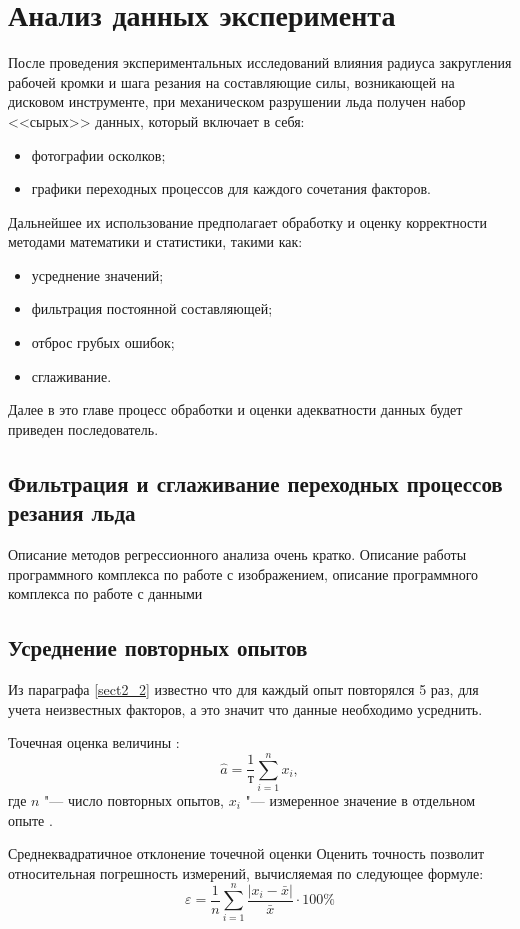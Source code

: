 \chapter{Анализ данных эксперимента}

После проведения экспериментальных исследований влияния радиуса закругления рабочей кромки и шага резания на составляющие силы, возникающей на дисковом инструменте, при механическом разрушении льда получен набор <<сырых>> данных, который включает в себя:
\begin{itemize}
	\item фотографии осколков;
	\item графики переходных процессов для каждого сочетания факторов.
\end{itemize}

Дальнейшее их использование предполагает обработку и оценку корректности методами математики и статистики, такими как:
\begin{itemize}
	\item усреднение значений;
	\item фильтрация постоянной составляющей;
	\item отброс грубых ошибок;
	\item сглаживание.
\end{itemize}

Далее в это главе процесс обработки и оценки адекватности данных будет приведен последователь.

\section{Фильтрация и сглаживание переходных процессов резания льда}
Описание методов регрессионного анализа очень кратко. Описание работы программного комплекса по работе с изображением, описание программного комплекса по работе с данными

\section{Усреднение повторных опытов}

Из параграфа \ref{sect2_2} известно что для каждый опыт повторялся 5 раз, для учета неизвестных факторов, а это значит что данные необходимо усреднить.

Точечная оценка величины :
\begin{equation}\label{eq:x_ocenka}
\hat{a}=\frac{1}{т}\sum_{i=1}^{n} x_i,
\end{equation}
где $ n $ "--- число повторных опытов, $ x_i $ "--- измеренное значение в отдельном опыте \cite{Zajigaev}.

Среднеквадратичное отклонение точечной оценки 
Оценить точность позволит относительная погрешность измерений, вычисляемая по следующее формуле:
\begin{equation}\label{eq:Error}
\varepsilon=\frac{1}{n}\sum_{i=1}^{n} \frac{\left| x_i-\bar{x}\right| }{\bar{x}}\cdot100\%
\end{equation}